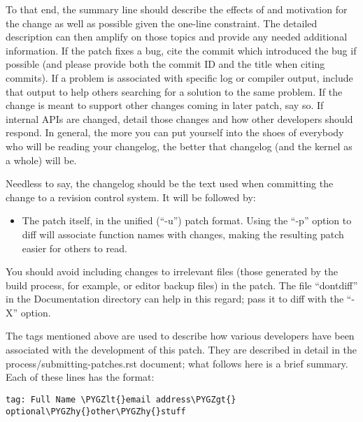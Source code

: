 \documentclass[a4paper,8pt,english]{sphinxmanual}
\def\PYGZlt{\char`\<}
\def\PYGZgt{\char`\>}
\def\PYGZhy{\char`\-}
\begin{document}
To that end, the summary line should describe the effects of and motivation
for the change as well as possible given the one-line constraint.  The
detailed description can then amplify on those topics and provide any
needed additional information.  If the patch fixes a bug, cite the commit
which introduced the bug if possible (and please provide both the commit ID
and the title when citing commits).  If a problem is associated with
specific log or compiler output, include that output to help others
searching for a solution to the same problem.  If the change is meant to
support other changes coming in later patch, say so.  If internal APIs are
changed, detail those changes and how other developers should respond.  In
general, the more you can put yourself into the shoes of everybody who will
be reading your changelog, the better that changelog (and the kernel as a
whole) will be.

Needless to say, the changelog should be the text used when committing the
change to a revision control system.  It will be followed by:
\begin{itemize}
\item {} 
The patch itself, in the unified (``-u'') patch format.  Using the ``-p''
option to diff will associate function names with changes, making the
resulting patch easier for others to read.

\end{itemize}

You should avoid including changes to irrelevant files (those generated by
the build process, for example, or editor backup files) in the patch.  The
file ``dontdiff'' in the Documentation directory can help in this regard;
pass it to diff with the ``-X'' option.

The tags mentioned above are used to describe how various developers have
been associated with the development of this patch.  They are described in
detail in the process/submitting-patches.rst document; what follows here is a brief
summary.  Each of these lines has the format:

\begin{Verbatim}[commandchars=\\\{\}]
tag: Full Name \PYGZlt{}email address\PYGZgt{}  optional\PYGZhy{}other\PYGZhy{}stuff
\end{Verbatim}
\end{document}
